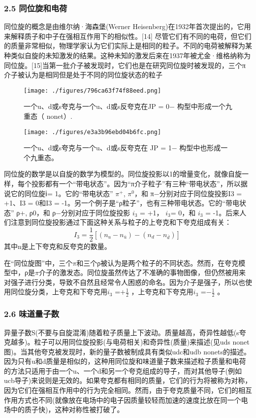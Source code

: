 \subsubsection{2.5 同位旋和电荷}
同位旋的概念是由维尔纳·海森堡(Werner Heisenberg)在1932年首次提出的，它用来解释质子和中子在强相互作用下的相似性。[14] 尽管它们有不同的电荷，但它们的质量非常相似，物理学家认为它们实际上是相同的粒子。不同的电荷被解释为某种类似自旋的未知激发的结果。这种未知的激发后来在1937年被尤金·维格纳称为同位旋。[15]当第一批介子被发现时，它们也是在研究同位旋时被发现的，三个π介子被认为是相同但是处于不同的同位旋状态的粒子
\begin{figure}[ht]
\centering
\texttt{[image: ./figures/796ca63f74f88eed.png]}
\caption{一个u、d或s夸克与一个u、d或s反夸克在JP = 0− 构型中形成一个九重态（ nonet）.} \label{fig_JZ_1}
\end{figure}
\begin{figure}[ht]
\centering
\texttt{[image: ./figures/e3a3b96ebd04b6fc.png]}
\caption{一个u、d或s夸克与一个u、d或s反夸克在 JP = 1− 构型中也形成一个九重态。} \label{fig_JZ_2}
\end{figure}
同位旋的数学是以自旋的数学为模型的。同位旋投影以1的增量变化，就像自旋一样，每个投影都有一个“带电状态”。因为“π介子粒子”有三种“带电状态”，所以据说它的同位旋ⅰ= 1。它的“带电状态” $\pi^+$, $\pi^0$，和 π−分别对应于同位旋投影I3 = +1、I3 = 0和I3 = -1。另一个例子是“ρ粒子”，也有三种带电状态。它的“带电状态” ρ+, ρ0，和 ρ−分别对应于同位旋投影 $i_3$ = +1， $i_3$= 0，和 $i_3$ = -1。后来人们注意到同位旋投影通过下面这种关系与粒子的上夸克和下夸克组成有关：\begin{equation}
I_3=\frac{1}{2}[(n_u-n_{\bar u})-(n_d-n_{\bar d})]~
\end{equation}
其中n是上下夸克和反夸克的数量。

在“同位旋图”中，三个$\pi$和三个ρ被认为是两个粒子的不同状态。然而，在夸克模型中，ρ是$\pi$介子的激发态。同位旋虽然传达了不准确的事物图像，但仍然被用来对强子进行分类，导致不自然且经常令人困惑的命名。因为介子是强子，所以也使用同位旋分类，上夸克和下夸克用$ i_3$ =$+\frac{1}{2}$ ，上夸克和下夸克用$ i_3$ =$-\frac{1}{2}$  。

\subsubsection{2.6 味道量子数}
异量子数S(不要与自旋混淆)随着粒子质量上下波动。质量越高，奇异性越低(s夸克越多)。粒子可以用同位旋投影(与电荷相关)和奇异性(质量)来描述(见uds nonet图)。当其他夸克被发现时，新的量子数被制成具有类似udc和udb nonets的描述。因为只有u和d质量是相似的，这种用同位旋和味道量子数来描述粒子质量和电荷的方法只适用于由一个u、一个d和另一个夸克组成的导子，而对其他导子(例如ucb导子)来说则是无效的。如果夸克都有相同的质量，它们的行为将被称为对称，因为它们在强相互作用中的行为完全相同。然而，由于夸克质量不同，它们的相互作用方式也不同(就像放在电场中的电子因质量较轻而加速的速度比放在同一个电场中的质子快)，这种对称性被打破了。

